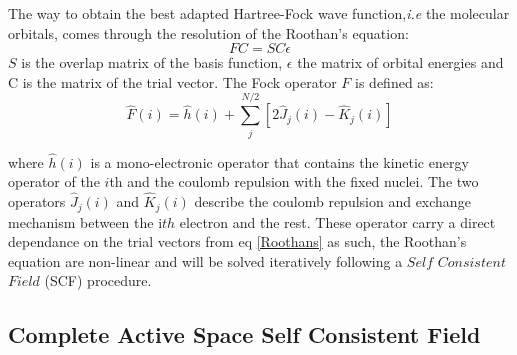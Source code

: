 \documentclass[10pt]{report}
\numberwithin{equation}{section}
\begin{document}
The way to obtain the best adapted Hartree-Fock wave function,\textit{i.e} the molecular orbitals, comes through the resolution of the Roothan's equation:
\begin{equation}\label{Roothans}
    FC=SC\epsilon
\end{equation}
$S$ is the overlap matrix of the basis function, $\epsilon$ the matrix of orbital energies and C is the matrix of the trial vector.
The Fock operator $F$ is defined as:
\begin{equation}
    \hat{F}(i)=\hat{h}(i)+\sum_{j}^{N/2}[2\hat{J}_{j}(i)-\hat{K}_{j}(i)]
\end{equation}

where $\hat{h}(i)$ is a mono-electronic operator that contains the kinetic energy operator of the $i$th and the coulomb repulsion with the fixed nuclei. 
The two operators $\hat{J}_{j}(i)$ and $\hat{K}_{j}(i)$ describe the coulomb repulsion and exchange mechanism between the i$th$ electron and the rest.
These operator carry a direct dependance on the trial vectors from eq \ref{Roothans} as such, the Roothan's equation are non-linear and will be solved iteratively following a $Self$ $Consistent$ $Field$ (SCF) procedure.


\subsection{Complete Active Space Self Consistent Field}
\end{document}
